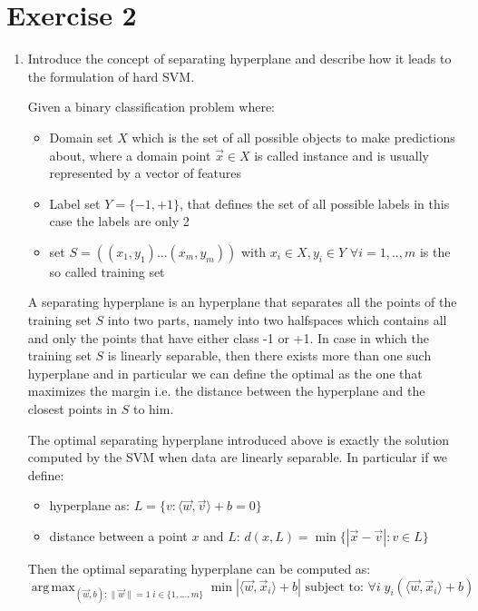 \documentclass[a4paper,11pt,oneside]{book}
\DeclareMathOperator*{\argmax}{arg\,max}
\begin{document}
\section{Exercise 2}
\begin{enumerate}
\item Introduce the concept of separating hyperplane and describe how it leads to the formulation of hard SVM.
    \begin{solution}
        Given a binary classification problem where:
        \begin{itemize}
        \item Domain set $X$ which is the set of all possible objects to make predictions about, where a domain point $\vec{x} \in X$ is called instance and is usually represented by a vector of features
        \item Label set $Y = \{-1,+1\}$, that defines the set of all possible labels in this case the labels are only 2 
        \item set $S = ((x_1, y_1) ... (x_m, y_m))$ with $x_i \in X, y_i \in Y$ $\forall i = 1,..,m$ is the so called training set
        \end{itemize}
        
        A separating hyperplane is an hyperplane that separates all the points of the training set $S$ into two parts, namely into two halfspaces which contains all and only the points that have either class -1 or +1.
        In case in which the training set $S$ is linearly separable, then there exists more than one such hyperplane and in particular we can define the optimal as the one that maximizes the margin i.e. the distance between the hyperplane and the closest points in $S$ to him.
        
        The optimal separating hyperplane introduced above is exactly the solution computed by the SVM when data are linearly separable. In particular if we define:
        \begin{itemize}
        \item hyperplane as: $L = \{v :\langle \vec{w}, \vec{v} \rangle +b = 0\}$
        \item distance between a point $x$ and $L$: $d(x,L) = \min \{|\vec{x} - \vec{v}|: v \in L\}$
        \end{itemize}
        
        Then the optimal separating hyperplane can be computed as:
        $$\argmax_{(\vec{w},b): \|\vec{w}\|=1 \; i\in\{1,...,m\}} \min |\langle \vec{w},\vec{x}_i \rangle +b| \text{ subject to: } \forall i \; y_i(\langle \vec{w},\vec{x}_i \rangle +b)$$
        

\end{solution}
\end{enumerate}
\end{document}
